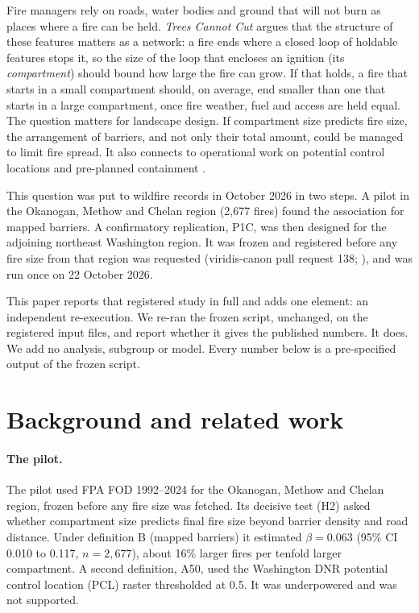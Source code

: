 \documentclass[11pt]{article}
\begin{document}
Fire managers rely on roads, water bodies and ground that will not burn as places where a fire can be held.
\emph{Trees Cannot Cut} \citep{Hart2026TCC} argues that the structure of these features matters as a network:
a fire ends where a closed loop of holdable features stops it, so the size of the loop that encloses an ignition
(its \emph{compartment}) should bound how large the fire can grow. If that holds, a fire that starts in a small
compartment should, on average, end smaller than one that starts in a large compartment, once fire weather, fuel and access are
held equal. The question matters for landscape design. If compartment size predicts fire size, the arrangement of
barriers, and not only their total amount, could be managed to limit fire spread. It also connects to operational
work on potential control locations and pre-planned containment \citep{OConnor2016,OConnor2017PCL}.

This question was put to wildfire records in October 2026 in two steps. A pilot in the Okanogan, Methow and Chelan region
(2{,}677 fires) found the association for mapped barriers. A confirmatory replication, P1C, was then designed for the
adjoining northeast Washington region. It was frozen and registered before any fire size from that region was requested
(viridis-canon pull request 138; \citealp{ViridisCanonPR138}), and was run once on 22 October 2026.

This paper reports that registered study in full and adds one element: an independent re-execution. We re-ran the frozen script,
unchanged, on the registered input files, and report whether it gives the published numbers. It does. We add no
analysis, subgroup or model. Every number below is a pre-specified output of the frozen script.

\section{Background and related work}

\paragraph{The pilot.} The pilot used FPA FOD 1992--2024 for the Okanogan, Methow and Chelan region, frozen before any
fire size was fetched. Its decisive test (H2) asked whether compartment size predicts final fire size beyond barrier
density and road distance. Under definition B (mapped barriers) it estimated $\beta=0.063$ (95\% CI 0.010 to 0.117,
$n=2{,}677$), about 16\% larger fires per tenfold larger compartment. A second definition, A50, used the Washington DNR potential control
location (PCL) raster \citep{OConnor2017PCL} thresholded at 0.5. It was underpowered and was not supported.
\end{document}
